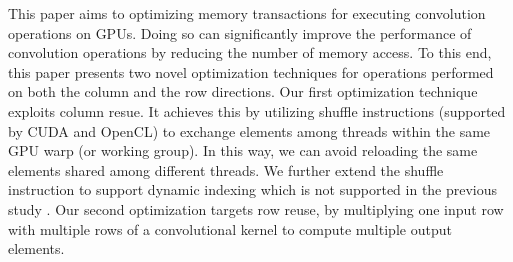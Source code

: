 
This paper aims to optimizing memory transactions for executing convolution operations on GPUs. Doing so can
significantly improve the performance of convolution operations by reducing the number of memory access.  To this end,
this paper presents two novel optimization techniques for operations performed on both the column and the row
directions. Our first optimization technique exploits column resue. It achieves this by utilizing shuffle instructions
(supported by CUDA and OpenCL) to exchange elements among threads within the same GPU warp (or working group). In this
way, we can avoid reloading the same elements shared among different threads. We further extend the shuffle instruction
to support dynamic indexing which is not supported in the previous study \cite{vasilache2014fast}.  Our second
optimization targets row reuse, by multiplying one input row with multiple rows of a convolutional kernel to compute
multiple output elements.




